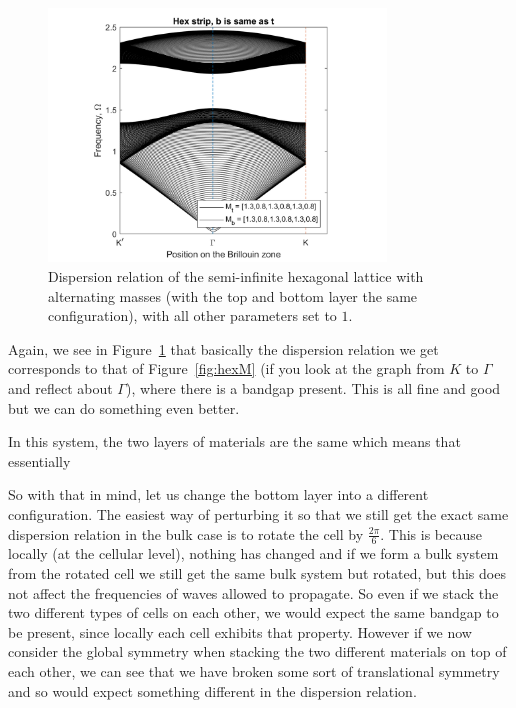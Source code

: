 \begin{figure}[!h]
\centering
\includegraphics[width=0.8\textwidth]{imgs/hexstripperturbM.png}
\caption{\label{fig:hexstripM} Dispersion relation of the semi-infinite
  hexagonal lattice with alternating masses (with the top and bottom layer the
  same configuration), with all other parameters set to $1$.}
\end{figure}

Again, we see in Figure~\ref{fig:hexstripM} that basically the dispersion
relation we get corresponds to that of Figure~\ref{fig:hexM} (if you look at
the graph from $K$ to $\Gamma$ and reflect about $\Gamma$), where there is a
bandgap present. This is all fine and good but we can do something even better.

In this system, the two layers of materials are the same which means that
essentially

So with that in mind, let us change the bottom layer into a different
configuration. The easiest way of perturbing it so that we still get the exact
same dispersion relation in the bulk case is to rotate the cell by
$\frac{2\pi}{6}$. This is because locally (at the cellular level), nothing has
changed and if we form a bulk system from the rotated cell we still get the
same bulk system but rotated, but this does not affect the frequencies of waves
allowed to propagate. So even if we stack the two different types of cells on
each other, we would expect the same bandgap to be present, since locally each
cell exhibits that property. However if we now consider the global symmetry
when stacking the two different materials on top of each other, we can see that
we have broken some sort of translational symmetry and so would expect
something different in the dispersion relation.

